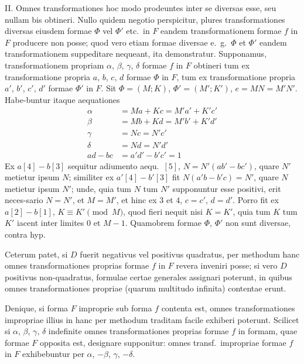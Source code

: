 \documentclass[12pt,a4paper]{article}
\theoremstyle{plain}
\theoremstyle{definition}
\theoremstyle{remark}
\begin{document}
II. Omnes transformationes hoc modo prodeuntes inter se diversas esse, seu nullam bis obtineri. Nullo quidem negotio perspicitur, plures transformationes diversas eiusdem formae $\Phi$ vel $\Phi'$ etc.\ in $F$ eandem transformationem formae $f$ in $F$ producere non posse; quod vero etiam formae diversae e.\ g.\ $\Phi$ et $\Phi'$ eandem transformationem suppeditare nequeant, ita demonstratur. Supponamus, transformationem propriam $\alpha$, $\beta$, $\gamma$, $\delta$ formae $f$ in $F$ obtineri tum ex transformatione propria $a$, $b$, $c$, $d$ formae $\Phi$ in $F$, tum ex transformatione propria $a'$, $b'$, $c'$, $d'$ formae $\Phi'$ in $F$. Sit $\Phi=(M;K)$, $\Phi'=(M';K')$, $e=MN=M'N'$. Habe-buntur itaque aequationes
\begin{align*}
\alpha &= Ma+Kc = M'a'+K'c' \tag{1} \\
\beta &= Mb+Kd = M'b'+K'd' \tag{2} \\
\gamma &= Nc = N'c' \tag{3} \\
\delta &= Nd = N'd' \tag{4} \\
ad-bc &= a'd'-b'c'=1 \tag{5}
\end{align*}
Ex $a[4]-b[3]$ sequitur adiumento aequ.\ $[5]$, $N=N'(ab'-bc')$, quare $N'$ metietur ipsum $N$; similiter ex $a'[4]-b'[3]$ fit $N(a'b-b'c)=N'$, quare $N$ metietur ipsum $N'$; unde, quia tum $N$ tum $N'$ supponuntur esse positivi, erit neces-sario $N=N'$, et $M=M'$, et hinc ex $3$ et $4$, $c=c'$, $d=d'$. Porro fit ex $a[2]-b[1]$, $K \equiv K' \pmod{M}$, quod fieri nequit nisi $K=K'$, quia tum $K$ tum $K'$ iacent inter limites $0$ et $M-1$. Quamobrem formae $\Phi$, $\Phi'$ non sunt diversae, contra hyp.

Ceterum patet, si $D$ fuerit negativus vel positivus quadratus, per methodum hanc omnes transformationes proprias formae $f$ in $F$ revera inveniri posse; si vero $D$ positivus non-quadratus, formulae certae generales assignari poterunt, in quibus omnes transformationes propriae (quarum multitudo infinita) contentae erunt.

Denique, si forma $F$ improprie sub forma $f$ contenta est, omnes transformationes impropriae illius in hanc per methodum traditam facile exhiberi poterunt. Scilicet si $\alpha$, $\beta$, $\gamma$, $\delta$ indefinite omnes transformationes proprias formae $f$ in formam, quae formae $F$ opposita est, designare supponitur: omnes transf.\ impropriae formae $f$ in $F$ exhibebuntur per $\alpha$, $-\beta$, $\gamma$, $-\delta$.
\end{document}
